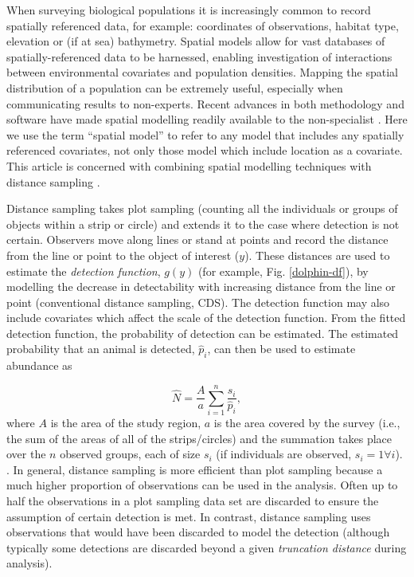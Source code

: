 \documentclass[a4paper,12pt]{article}
\begin{document}
When surveying biological populations it is increasingly common to record spatially referenced data, for example: coordinates of observations, habitat type, elevation or (if at sea) bathymetry. Spatial models allow for vast databases of spatially-referenced data \citep[e.g. OBIS-SEAMAP,][]{Halpin:2009je} to be harnessed, enabling investigation of interactions between environmental covariates and population densities. Mapping the spatial distribution of a population can be extremely useful, especially when communicating results to non-experts. Recent advances in both methodology and software have made spatial modelling readily available to the non-specialist \citep[e.g.,][]{Wood:2006wz, Rue:2009tw}. Here we use the term ``spatial model'' to refer to any model that includes any spatially referenced covariates, not only those model which include location as a covariate. This article is concerned with combining spatial modelling techniques with distance sampling \citep{Buckland:2001vm, Buckland:2004ts}. 

Distance sampling takes plot sampling (counting all the individuals or groups of objects within a strip or circle) and extends it to the case where detection is not certain. Observers move along lines or stand at points and record the distance from the  line or point to the object of interest ($y$). These distances are used to estimate the \textit{detection function}, $g(y)$ (for example, Fig. \ref{dolphin-df}), by modelling the decrease in detectability with increasing distance from the line or point (conventional distance sampling, CDS). The detection function may also include covariates \citep[multiple covariate distance sampling, MCDS;][]{Marques:2007vm} which affect the scale of the detection function. From the fitted detection function, the probability of detection can be estimated. The estimated probability that an animal is detected, $\hat{p}_i$, can then be used to estimate abundance as

\begin{equation}
\hat{N} = \frac{A}{a} \sum_{i=1}^{n} \frac{s_i}{\hat{p}_i},
\label{ht-est}
\end{equation}
where $A$ is the area of the study region, $a$ is the area covered by the survey (i.e., the sum of the areas of all of the strips/circles) and the summation takes place over the $n$ observed groups, each of size $s_i$ (if individuals are observed, $s_i=1 \forall i$). \citep[Chapter 3]{Buckland:2001vm}. In general, distance sampling is more efficient than plot sampling because a much higher proportion of observations can be used in the analysis. Often up to half the observations in a plot sampling data set are discarded to ensure the assumption of certain detection is met. In contrast, distance sampling uses observations that would have been discarded to model the detection (although typically some detections are discarded beyond a given \textit{truncation distance} during analysis).
\end{document}
